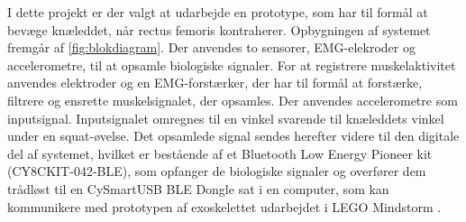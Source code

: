 I dette projekt er der valgt at udarbejde en prototype, som har til formål at bevæge knæleddet, når rectus femoris kontraherer. Opbygningen af systemet fremgår af \autoref{fig:blokdiagram}. Der anvendes to sensorer, EMG-elekroder og accelerometre, til at opsamle biologiske signaler. 
For at registrere muskelaktivitet anvendes elektroder og en EMG-forstærker, der har til formål at forstærke, filtrere og ensrette muskelsignalet, der opsamles. 
Der anvendes accelerometre som inputsignal. Inputsignalet omregnes til en vinkel svarende til knæleddets vinkel under en squat-øvelse. 
Det opsamlede signal sendes herefter videre til den digitale del af systemet, hvilket er bestående af et Bluetooth Low Energy Pioneer kit (CY8CKIT-042-BLE), som opfanger de biologiske signaler og overfører dem trådløst til en CySmartUSB BLE Dongle sat i en computer, som kan kommunikere med prototypen af exoskelettet udarbejdet i LEGO Mindstorm . 

